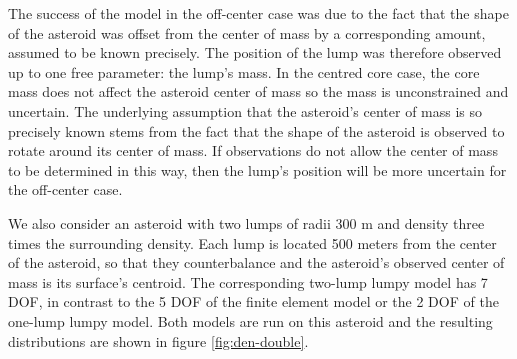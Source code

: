 \documentclass[fleqn,usenatbib]{mnras}
\begin{document}
The success of the model in the off-center case was due to the fact that the shape of the asteroid was offset from the center of mass by a corresponding amount, assumed to be known precisely. The position of the lump was therefore observed up to one free parameter: the lump's mass. In the centred core case, the core mass does not affect the asteroid center of mass so the mass is unconstrained and uncertain. The underlying assumption that the asteroid's center of mass is so precisely known stems from the fact that the shape of the asteroid is observed to rotate around its center of mass. If observations do not allow the center of mass to be determined in this way, then the lump's position will be more uncertain for the off-center case.

We also consider an asteroid with two lumps of radii 300 m and density three times the surrounding density. Each lump is located 500 meters from the center of the asteroid, so that they counterbalance and the asteroid's observed center of mass is its surface's centroid. The corresponding two-lump lumpy model has 7 DOF, in contrast to the 5 DOF of the finite element model or the 2 DOF of the one-lump lumpy model. Both models are run on this asteroid and the resulting distributions are shown in figure \ref{fig:den-double}.
\end{document}
